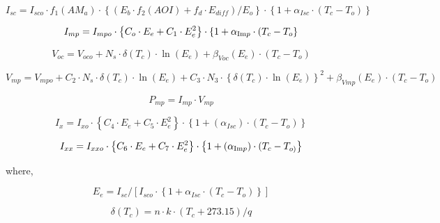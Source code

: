 \begin{equation}
{I_{sc}} = {I_{sco}} \cdot {f_1}\left( {A{M_a}} \right) \cdot \left\{ {\left( {{E_b} \cdot {f_2}\left( {AOI} \right) + {f_d} \cdot {E_{diff}}} \right)/{E_o}} \right\} \cdot \left\{ {1 + {\alpha_{Isc}} \cdot \left( {{T_c} - {T_o}} \right)} \right\}
\end{equation}

\begin{equation}
{I_{mp}} = {I_{mpo}} \cdot \left\{ {{C_o} \cdot {E_e} + {C_1} \cdot E_e^2} \right\} \cdot \left\{ {1 + {\alpha_{{\mathop{\rm Im}\nolimits} p}} \cdot ({T_c} - {T_o}} \right\}
\end{equation}

\begin{equation}
{V_{oc}} = {V_{oco}} + {N_s} \cdot \delta ({T_c}) \cdot \ln ({E_e}) + {\beta_{Voc}}({E_e}) \cdot \left( {{T_c} - {T_o}} \right)
\end{equation}

\begin{equation}
{V_{mp}} = {V_{mpo}} + {C_2} \cdot {N_s} \cdot \delta \left( {T_c^{}} \right) \cdot \ln \left( {{E_e}} \right) + {C_3} \cdot {N_3} \cdot {\left\{ {\delta \left( {T_c^{}} \right) \cdot \ln \left( {{E_e}} \right)} \right\}^2} + {\beta_{Vmp}}({E_e}) \cdot ({T_c} - {T_o})
\end{equation}

\begin{equation}
{P_{mp}} = {I_{mp}} \cdot {V_{mp}}
\end{equation}

\begin{equation}
{I_x} = {I_{xo}} \cdot \left\{ {{C_4} \cdot {E_e} + {C_5} \cdot E_e^2} \right\} \cdot \left\{ {1 + ({\alpha_{Isc}}) \cdot ({T_c} - {T_o})} \right\}
\end{equation}

\begin{equation}
{I_{xx}} = {I_{xxo}} \cdot \left\{ {{C_6} \cdot {E_e} + {C_7} \cdot E_e^2} \right\} \cdot \left\{ {1 + ({\alpha_{{\mathop{\rm Im}\nolimits} p}}) \cdot ({T_c} - {T_{o)}}} \right\}
\end{equation}

where,

\begin{equation}
{E_e} = {I_{sc}}/\left[ {{I_{sco}} \cdot \left\{ {1 + {\alpha_{Isc}} \cdot ({T_c} - {T_o})} \right\}} \right]
\end{equation}

\begin{equation}
\delta ({T_c}) = n \cdot k \cdot ({T_c} + 273.15)/q
\end{equation}

